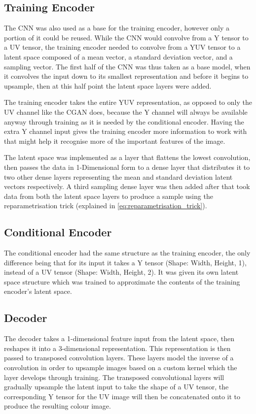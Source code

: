 \documentclass{l4proj}
\begin{document}
\subsection{Training Encoder}
The CNN was also used as a base for the training encoder, however only a portion of it could be reused. While the CNN would convolve from a Y tensor to a UV tensor, the training encoder needed to convolve from a YUV tensor to a latent space composed of a mean vector, a standard deviation vector, and a sampling vector. The first half of the CNN was thus taken as a base model, when it convolves the input down to its smallest representation and before it begins to upsample, then at this half point the latent space layers were added.

The training encoder takes the entire YUV representation, as opposed to only the UV channel like the CGAN does, because the Y channel will always be available anyway through training as it is needed by the conditional encoder. Having the extra Y channel input gives the training encoder more information to work with that might help it recognise more of the important features of the image.

The latent space was implemented as a layer that flattens the lowest convolution, then passes the data in 1-Dimensional form to a dense layer that distributes it to two other dense layers representing the mean and standard deviation latent vectors respectively. A third sampling dense layer was then added after that took data from both the latent space layers to produce a sample using the reparametrisation trick (explained in \ref{eq:reparametrisation_trick}).

\subsection{Conditional Encoder}
The conditional encoder had the same structure as the training encoder, the only difference being that for its input it takes a Y tensor (Shape: Width, Height, 1), instead of a UV tensor (Shape: Width, Height, 2). It was given its own latent space structure which was trained to approximate the contents of the training encoder's latent space. 

\subsection{Decoder}
The decoder takes a 1-dimensional feature input from the latent space, then reshapes it into a 3-dimensional representation. This representation is then passed to transposed convolution layers. These layers model the inverse of a convolution in order to upsample images based on a custom kernel which the layer develops through training. The transposed convolutional layers will gradually upsample the latent input to take the shape of a UV tensor, the corresponding Y tensor for the UV image will then be concatenated onto it to produce the resulting colour image.
\end{document}
